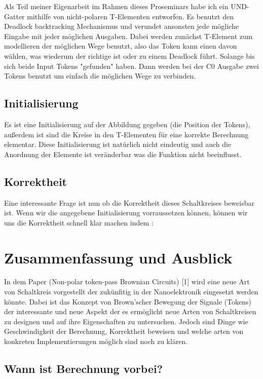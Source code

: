 Als Teil meiner Eigenarbeit im Rahmen dieses Proseminars habe ich ein UND-Gatter
mithilfe von nicht-polaren T-Elementen entworfen.
%
Es benutzt den Deadlock backtracking Mechanismus und verundet ansonsten jede 
mögliche Eingabe mit jeder möglichen Ausgaben. 
%
Dabei werden zunächst T-Element zum modellieren der möglichen Wege benutzt, also 
das Token kann einen davon wählen, was wiederum der richtige ist oder zu einem Deadlock
führt. Solange bis sich beide Input Tokens "gefunden" haben.
%
Dann werden bei der C0 Ausgabe zwei Tokens benutzt um einfach die möglichen Wege zu 
verbinden.


\subsection{Initialisierung}
Es ist eine Initialisierung auf der Abbildung gegeben (die Position der Tokens), 
außerdem ist sind die Kreise in den T-Elementen für eine korrekte Berechnung
elementar.
%
Diese Initialisierung ist natürlich nicht eindeutig und auch die Anordnung der Elemente 
ist veränderbar was die Funktion nicht beeinflusst.

\subsection{Korrektheit}
Eine interessante Frage ist nun ob die Korrektheit dieses Schaltkreises beweisbar ist. 
Wenn wir die angegebene Initialisierung vorraussetzen können, können wir uns die 
Korrektheit schnell klar machen indem :



\section{Zusammenfassung und Ausblick}
In dem Paper (Non-polar token-pass Brownian Circuits) [1] wird eine neue Art
von Schaltkreis vorgestellt der zukünfitig in der Nanoelektronik eingesetzt
werden könnte.
%
Dabei ist das Konzept von Brown'scher Bewegung der Signale (Tokens) 
der interessante und neue Aspekt der es ermöglicht neue Arten von Schaltkreisen 
zu designen und auf ihre Eigenschaften zu untersuchen.
%
Jedoch sind Dinge wie Geschwindigkeit der Berechnung, Korrektheit beweisen und 
welche arten von konkreten Implementierungen möglich sind noch zu klären.


\subsection{Wann ist Berechnung vorbei?}

